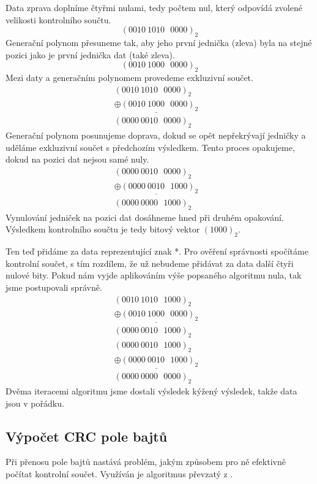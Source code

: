 Data zprava doplníme čtyřmi nulami, tedy počtem nul, který odpovídá zvolené velikosti kontrolního součtu.
$$ (0010~1010~~~0000)_2 $$
Generační polynom přesuneme tak, aby jeho první jednička (zleva) byla na stejné pozici jako je první jednička dat (také zleva).
$$ (0010~1000~~~0000)_2 $$
Mezi daty a generačním polynomem provedeme exkluzivní součet.
\begin{eqnarray}
    (0010~1010~~~0000)_2  & \nonumber\\\underline{\oplus
    (0010~1000~~~0000)_2} & \nonumber\\
    (0000~0010~~~0000)_2  & \nonumber
\end{eqnarray}
Generační polynom posunujeme doprava, dokud se opět nepřekrývají jedničky a uděláme exkluzivní součet s předchozím výsledkem. Tento proces opakujeme, dokud na pozici dat nejsou samé nuly.
\begin{eqnarray}
    (0000~0010~~~0000)_2  & \nonumber\\\underline{\oplus
    (0000~0010~~~1000)_2} & \nonumber\\
    (0000~0000~~~1000)_2  & \nonumber
\end{eqnarray}
Vynulování jedniček na pozici dat dosáhneme hned při druhém opakování. Výsledkem kontrolního součtu je tedy bitový vektor $(1000)_2$.

Ten teď přidáme za data reprezentující znak *. Pro ověření správnosti spočítáme kontrolní součet, s tím rozdílem, že už nebudeme přidávat za data další čtyři nulové bity. Pokud nám vyjde aplikováním výše popsaného algoritmu nula, tak jsme postupovali správně.
\begin{eqnarray}
    (0010~1010~~~1000)_2  & \nonumber\\\underline{\oplus
    (0010~1000~~~0000)_2} & \nonumber\\
    (0000~0010~~~1000)_2  & \nonumber
\end{eqnarray}
\begin{eqnarray}
    (0000~0010~~~1000)_2  & \nonumber\\\underline{\oplus
    (0000~0010~~~1000)_2} & \nonumber\\
    (0000~0000~~~0000)_2  & \nonumber
\end{eqnarray}
Dvěma iteracemi algoritmu jsme dostali výsledek kýžený výsledek, takže data jsou v pořádku.

\subsection{Výpočet CRC pole bajtů}
Při přenosu pole bajtů nastává problém, jakým způsobem pro ně efektivně počítat kontrolní součet. Využíván je algoritmus převzatý z \cite{crc-wiki}.

